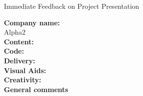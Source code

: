 \documentclass{article}
\begin{document}
\begin{center}
\Huge{Immediate Feedback on Project Presentation}\\
\end{center}


\normalsize
\textbf{Company name:}\\

Alpha2 \\

\textbf{Content:}\\
\textbf{Code:}\\
\textbf{Delivery:}\\
\textbf{Visual Aids:}\\
\textbf{Creativity:}\\

\textbf{General comments}\\
\end{document}
